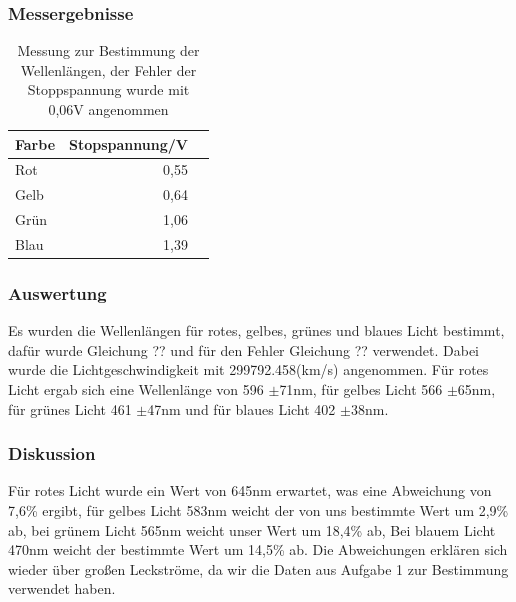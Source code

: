 \documentclass[12px]{scrartcl}
\begin{document}
\subsubsection{Messergebnisse}
\begin{table}[H]
\caption{Messung zur Bestimmung der Wellenlängen, der Fehler der Stoppspannung wurde mit 0,06V angenommen}
\begin{center}
\begin{tabular}{|l|r|r|}
\hline
Farbe & \multicolumn{1}{l|}{Stopspannung/V} \\ \hline
Rot & 0,55 \\ \hline
Gelb & 0,64 \\ \hline
Grün & 1,06 \\ \hline
Blau & 1,39 \\ \hline
\end{tabular}
\end{center}
\label{tab:a_2.2}
\end{table}

\subsubsection{Auswertung}
Es wurden die Wellenlängen für rotes, gelbes, grünes und blaues Licht bestimmt, dafür wurde Gleichung ?? und für den Fehler Gleichung ?? verwendet. Dabei wurde die Lichtgeschwindigkeit mit 299792.458(km/s) angenommen. Für rotes Licht ergab sich eine Wellenlänge von 596 $\pm$71nm, für gelbes Licht 566 $\pm$65nm, für grünes Licht 461 $\pm$47nm und für blaues Licht 402 $\pm$38nm.

\subsubsection{Diskussion}
Für rotes Licht wurde ein Wert von 645nm erwartet, was eine Abweichung von 7,6\% ergibt, für gelbes Licht 583nm weicht der von uns bestimmte Wert um  2,9\% ab, bei grünem Licht 565nm weicht unser Wert um 18,4\% ab, Bei blauem Licht 470nm weicht der bestimmte Wert um 14,5\% ab. Die Abweichungen erklären sich wieder über großen Leckströme, da wir die Daten aus Aufgabe 1 zur Bestimmung verwendet haben.
\end{document}
